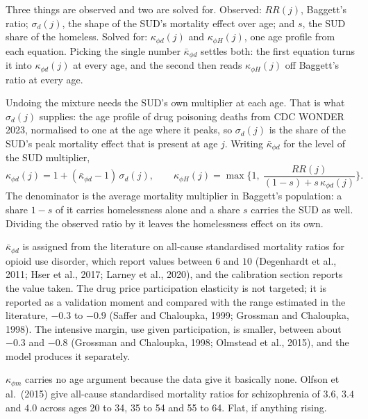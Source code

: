 \documentclass[10pt]{article}
\begin{document}
Three things are observed and two are solved for. Observed: $RR(j)$,
Baggett's ratio; $\sigma_d(j)$, the shape of the SUD's mortality effect over age;
and $s$, the SUD share of the homeless. Solved for: $\kappa_{\phi d}(j)$ and
$\kappa_{\phi H}(j)$, one age profile from each equation. Picking the single
number $\bar\kappa_{\phi d}$ settles both: the first equation turns it into
$\kappa_{\phi d}(j)$ at every age, and the second then reads
$\kappa_{\phi H}(j)$ off Baggett's ratio at every age.

Undoing the mixture needs the SUD's own multiplier at each age. That is what
$\sigma_d(j)$ supplies: the age profile of drug poisoning deaths from CDC WONDER 2023,
normalised to one at the age where it peaks, so $\sigma_d(j)$ is the share of the
SUD's peak mortality effect that is present at age $j$. Writing
$\bar\kappa_{\phi d}$ for the level of the SUD multiplier,
\begin{equation}\label{eq:fhaz}
\kappa_{\phi d}(j) = 1+(\bar\kappa_{\phi d}-1)\,\sigma_d(j),
\qquad
\kappa_{\phi H}(j) = \max\Big\{1,\ \frac{RR(j)}{(1-s)+s\,\kappa_{\phi d}(j)}\Big\}.
\end{equation}
The denominator is the average mortality multiplier in Baggett's population:
a share $1-s$ of it carries homelessness alone and a share $s$ carries the SUD as
well. Dividing the observed ratio by it leaves the homelessness effect on its
own.

$\bar\kappa_{\phi d}$ is assigned from the literature on all-cause
standardised mortality ratios for opioid use disorder, which report values
between $6$ and $10$ (Degenhardt et al., 2011; Hser et al., 2017; Larney et al.,
2020), and the calibration section reports the value taken. The drug price
participation elasticity is not targeted; it is reported as a validation moment
and compared with the range estimated in the literature, $-0.3$ to $-0.9$
(Saffer and Chaloupka, 1999; Grossman and Chaloupka, 1998). The intensive margin,
use given participation, is smaller, between about $-0.3$ and $-0.8$ (Grossman and
Chaloupka, 1998; Olmstead et al., 2015), and the model produces it separately.

$\kappa_{\phi m}$ carries no age argument because the data give it basically
none. Olfson et al.\ (2015) give all-cause standardised mortality ratios for schizophrenia of $3.6$, $3.4$ and $4.0$
across ages 20 to 34, 35 to 54 and 55 to 64. Flat, if anything rising.
\end{document}
